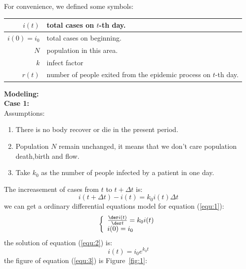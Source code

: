For convenience, we defined some symbols:
\begin{center}
\begin{tabular}{|r|p{7cm}|}
\hline
$ i(t) $ & total cases on $t$-th day.\\
\hline
$ i(0)=i_0 $ & total cases on beginning.\\
\hline
$ N $ & population in this area.\\
\hline
$ k $ & infect factor\\
\hline
$ r(t) $ & number of people exited from the epidemic process on
$t$-th day.\\
\hline
\end{tabular}
\end{center}%
\textbf{\large Modeling:}\\
\textbf{Case 1:}\\
Assumptions:
\begin{enumerate}
  \item There is no body recover or die in the present period.
  \item Population $ N $ remain unchanged, it means
  that we don't care population death,birth and flow.
  \item Take $ k_0 $ as the number of people infected by
a patient in one day.
\end{enumerate}
The increasement of cases from $ t $ to $ t+\Delta t$ is:
\begin{equation}
i(t+\Delta{t})-i(t)=k_0i(t)\Delta{t}
\label{equ:1}
\end{equation}
we can get a ordinary differential equations model for 
equation (\ref{equ:1}):
\begin{equation}
\left\{
\begin{array}{l}
\frac{{\der}i(t)}{{\der}t}=k_0i(t)\\
i(0)=i_0
\end{array}\right.
\label{equ:2}
\end{equation}
the solution of equation (\ref{equ:2}) is:
\begin{equation}
i(t)=i_0e^{k_0t}
\label{equ:3}
\end{equation}
the figure of equation (\ref{equ:3}) is Figure~\ref{fig:1}:\par
